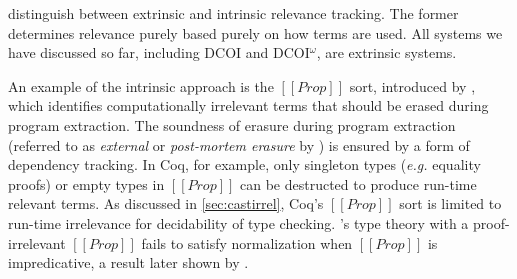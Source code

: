 \documentclass[acmsmall, screen=true, nonacm=true,
  review=\ifpublic false\else true\fi,
  anonymous=\ifanonymous true\else false\fi
]{acmart}
\makeatletter
\newcommand{\dcoi}{DCOI\@\xspace}
\newcommand{\name}{\texorpdfstring{DCOI$^{\omega}$\@\xspace}{DCOI-omega}}
\newcommand{\eg}{\textit{e.g.}\@\xspace}
\makeatother
\begin{document}

\citet{mishra:erasure} distinguish between extrinsic and intrinsic
relevance tracking. The former determines relevance purely based purely on 
how terms are used. All systems we have discussed so
far, including \dcoi and \name, are extrinsic systems.

An example of the intrinsic approach is
the $[[Prop]]$ sort, introduced by \citet{paulin-mohring:coc},
which identifies computationally irrelevant terms that
should be erased during program extraction.
The soundness of erasure during program extraction (referred to as
\emph{external} or \emph{post-mortem erasure} by
\citet{abel:irrelevance}) is ensured by a form of dependency
tracking. In Coq, for example,
only singleton types (\eg equality proofs) or empty
types in $[[Prop]]$ can be destructed to produce run-time
relevant terms.
As discussed in \cref{sec:castirrel},
Coq's $[[Prop]]$ sort is limited to run-time irrelevance for
decidability of type checking. \citet{werner:proofirrel}'s type theory with
a proof-irrelevant $[[Prop]]$ fails to satisfy normalization when
$[[Prop]]$ is impredicative, a result later shown by \citet{abel:failurenorm}.

\end{document}
